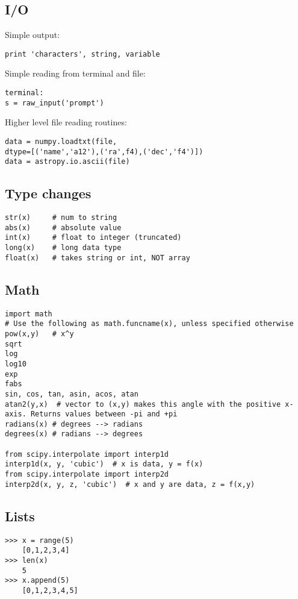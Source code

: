 \documentclass{article}
\begin{document}
\begin{multicols}{2}
\subsection{I/O}
Simple output:
\begin{lstlisting}
print 'characters', string, variable
\end{lstlisting}

Simple reading from terminal and file:
\begin{lstlisting}
terminal:
s = raw_input('prompt')
\end{lstlisting}

Higher level file reading routines:
\begin{lstlisting}
data = numpy.loadtxt(file,
dtype=[('name','a12'),('ra',f4),('dec','f4')])
data = astropy.io.ascii(file)
\end{lstlisting}

\subsection{Type changes}
\begin{lstlisting}
str(x)     # num to string
abs(x)     # absolute value
int(x)     # float to integer (truncated)
long(x)    # long data type
float(x)   # takes string or int, NOT array
\end{lstlisting}
\vfill
\columnbreak

\subsection{Math}
\begin{lstlisting}
import math
# Use the following as math.funcname(x), unless specified otherwise
pow(x,y)   # x^y
sqrt
log
log10
exp
fabs
sin, cos, tan, asin, acos, atan
atan2(y,x)  # vector to (x,y) makes this angle with the positive x-axis. Returns values between -pi and +pi
radians(x) # degrees --> radians
degrees(x) # radians --> degrees

from scipy.interpolate import interp1d
interp1d(x, y, 'cubic')  # x is data, y = f(x)
from scipy.interpolate import interp2d
interp2d(x, y, z, 'cubic')  # x and y are data, z = f(x,y)
\end{lstlisting}

\subsection{Lists}
\begin{lstlisting}
>>> x = range(5)
    [0,1,2,3,4]
>>> len(x)
    5
>>> x.append(5)
    [0,1,2,3,4,5]


\end{lstlisting}
\end{multicols}
\end{document}
